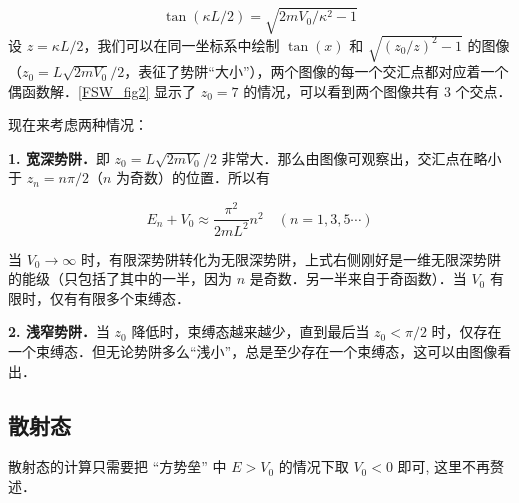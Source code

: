 \begin{equation}
\tan(\kappa L/2)=\sqrt{2mV_0/\kappa^2-1}
\end{equation}
设 $z=\kappa L/2$，我们可以在同一坐标系中绘制 $\tan(x)$ 和 $\sqrt{(z_0/z)^2-1}$ 的图像（$z_0=L\sqrt{2mV_0}/2$，表征了势阱“大小”），两个图像的每一个交汇点都对应着一个偶函数解．\autoref{FSW_fig2} 显示了 $z_0=7$ 的情况，可以看到两个图像共有 $3$ 个交点．


现在来考虑两种情况：

\textbf{1. 宽深势阱．}即 $z_0=L\sqrt{2mV_0}/2$ 非常大．那么由图像可观察出，交汇点在略小于 $z_n=n\pi/2$（$n$ 为奇数）的位置．所以有

\begin{equation}
E_n+V_0\approx \frac{\pi^2}{2mL^2}n^2\quad (n=1,3,5\cdots)
\end{equation}

当 $V_0\rightarrow \infty$ 时，有限深势阱转化为无限深势阱，上式右侧刚好是一维无限深势阱的能级（只包括了其中的一半，因为 $n$ 是奇数．另一半来自于奇函数）．当 $V_0$ 有限时，仅有有限多个束缚态．

\textbf{2. 浅窄势阱．}当 $z_0$ 降低时，束缚态越来越少，直到最后当 $z_0<\pi/2$ 时，仅存在一个束缚态．但无论势阱多么“浅小”，总是至少存在一个束缚态，这可以由图像看出．

\subsection{散射态}

散射态的计算只需要把 “方势垒” 中 $E > V_0$ 的情况下取 $V_0 < 0$ 即可, 这里不再赘述．
